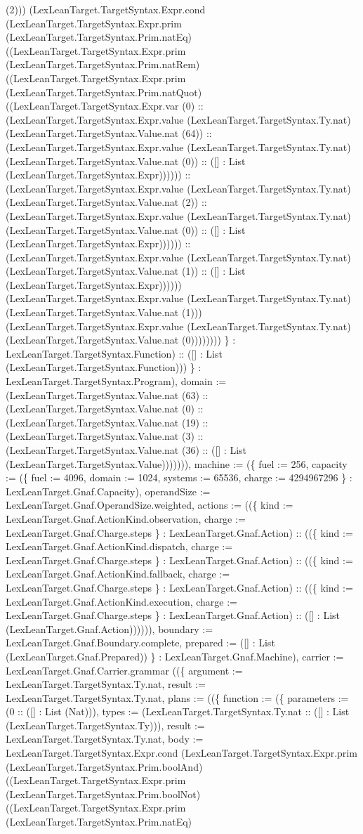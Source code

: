 \documentclass[11pt]{article}
\begin{document}
(2))) (LexLeanTarget.TargetSyntax.Expr.cond (LexLeanTarget.TargetSyntax.Expr.prim (LexLeanTarget.TargetSyntax.Prim.natEq) ((LexLeanTarget.TargetSyntax.Expr.prim (LexLeanTarget.TargetSyntax.Prim.natRem) ((LexLeanTarget.TargetSyntax.Expr.prim (LexLeanTarget.TargetSyntax.Prim.natQuot) ((LexLeanTarget.TargetSyntax.Expr.var (0) :: (LexLeanTarget.TargetSyntax.Expr.value (LexLeanTarget.TargetSyntax.Ty.nat) (LexLeanTarget.TargetSyntax.Value.nat (64)) :: (LexLeanTarget.TargetSyntax.Expr.value (LexLeanTarget.TargetSyntax.Ty.nat) (LexLeanTarget.TargetSyntax.Value.nat (0)) :: ([] : List (LexLeanTarget.TargetSyntax.Expr)))))) :: (LexLeanTarget.TargetSyntax.Expr.value (LexLeanTarget.TargetSyntax.Ty.nat) (LexLeanTarget.TargetSyntax.Value.nat (2)) :: (LexLeanTarget.TargetSyntax.Expr.value (LexLeanTarget.TargetSyntax.Ty.nat) (LexLeanTarget.TargetSyntax.Value.nat (0)) :: ([] : List (LexLeanTarget.TargetSyntax.Expr)))))) :: (LexLeanTarget.TargetSyntax.Expr.value (LexLeanTarget.TargetSyntax.Ty.nat) (LexLeanTarget.TargetSyntax.Value.nat (1)) :: ([] : List (LexLeanTarget.TargetSyntax.Expr)))))) (LexLeanTarget.TargetSyntax.Expr.value (LexLeanTarget.TargetSyntax.Ty.nat) (LexLeanTarget.TargetSyntax.Value.nat (1))) (LexLeanTarget.TargetSyntax.Expr.value (LexLeanTarget.TargetSyntax.Ty.nat) (LexLeanTarget.TargetSyntax.Value.nat (0)))))))) \} : LexLeanTarget.TargetSyntax.Function) :: ([] : List (LexLeanTarget.TargetSyntax.Function))) \} : LexLeanTarget.TargetSyntax.Program), domain := (LexLeanTarget.TargetSyntax.Value.nat (63) :: (LexLeanTarget.TargetSyntax.Value.nat (0) :: (LexLeanTarget.TargetSyntax.Value.nat (19) :: (LexLeanTarget.TargetSyntax.Value.nat (3) :: (LexLeanTarget.TargetSyntax.Value.nat (36) :: ([] : List (LexLeanTarget.TargetSyntax.Value))))))), machine := (\{ fuel := 256, capacity := (\{ fuel := 4096, domain := 1024, systems := 65536, charge := 4294967296 \} : LexLeanTarget.Gnaf.Capacity), operandSize := LexLeanTarget.Gnaf.OperandSize.weighted, actions := ((\{ kind := LexLeanTarget.Gnaf.ActionKind.observation, charge := LexLeanTarget.Gnaf.Charge.steps \} : LexLeanTarget.Gnaf.Action) :: ((\{ kind := LexLeanTarget.Gnaf.ActionKind.dispatch, charge := LexLeanTarget.Gnaf.Charge.steps \} : LexLeanTarget.Gnaf.Action) :: ((\{ kind := LexLeanTarget.Gnaf.ActionKind.fallback, charge := LexLeanTarget.Gnaf.Charge.steps \} : LexLeanTarget.Gnaf.Action) :: ((\{ kind := LexLeanTarget.Gnaf.ActionKind.execution, charge := LexLeanTarget.Gnaf.Charge.steps \} : LexLeanTarget.Gnaf.Action) :: ([] : List (LexLeanTarget.Gnaf.Action)))))), boundary := LexLeanTarget.Gnaf.Boundary.complete, prepared := ([] : List (LexLeanTarget.Gnaf.Prepared)) \} : LexLeanTarget.Gnaf.Machine), carrier := LexLeanTarget.Gnaf.Carrier.grammar ((\{ argument := LexLeanTarget.TargetSyntax.Ty.nat, result := LexLeanTarget.TargetSyntax.Ty.nat, plans := ((\{ function := (\{ parameters := (0 :: ([] : List (Nat))), types := (LexLeanTarget.TargetSyntax.Ty.nat :: ([] : List (LexLeanTarget.TargetSyntax.Ty))), result := LexLeanTarget.TargetSyntax.Ty.nat, body := LexLeanTarget.TargetSyntax.Expr.cond (LexLeanTarget.TargetSyntax.Expr.prim (LexLeanTarget.TargetSyntax.Prim.boolAnd) ((LexLeanTarget.TargetSyntax.Expr.prim (LexLeanTarget.TargetSyntax.Prim.boolNot) ((LexLeanTarget.TargetSyntax.Expr.prim (LexLeanTarget.TargetSyntax.Prim.natEq) 
\end{document}
